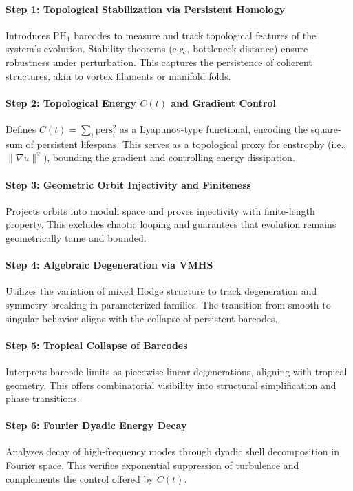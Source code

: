 \documentclass[11pt]{article}
\begin{document}
\paragraph{Step 1: Topological Stabilization via Persistent Homology} Introduces PH$_1$ barcodes to measure and track topological features of the system's evolution. Stability theorems (e.g., bottleneck distance) ensure robustness under perturbation. This captures the persistence of coherent structures, akin to vortex filaments or manifold folds.

\paragraph{Step 2: Topological Energy $C(t)$ and Gradient Control} Defines $C(t) = \sum_i \text{pers}_i^2$ as a Lyapunov-type functional, encoding the square-sum of persistent lifespans. This serves as a topological proxy for enstrophy (i.e., $\|\nabla u\|^2$), bounding the gradient and controlling energy dissipation.

\paragraph{Step 3: Geometric Orbit Injectivity and Finiteness} Projects orbits into moduli space and proves injectivity with finite-length property. This excludes chaotic looping and guarantees that evolution remains geometrically tame and bounded.

\paragraph{Step 4: Algebraic Degeneration via VMHS} Utilizes the variation of mixed Hodge structure to track degeneration and symmetry breaking in parameterized families. The transition from smooth to singular behavior aligns with the collapse of persistent barcodes.

\paragraph{Step 5: Tropical Collapse of Barcodes} Interprets barcode limits as piecewise-linear degenerations, aligning with tropical geometry. This offers combinatorial visibility into structural simplification and phase transitions.

\paragraph{Step 6: Fourier Dyadic Energy Decay} Analyzes decay of high-frequency modes through dyadic shell decomposition in Fourier space. This verifies exponential suppression of turbulence and complements the control offered by $C(t)$.
\end{document}
